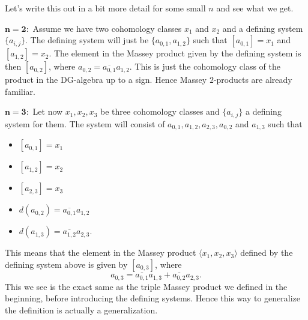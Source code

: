 Let's write this out in a bit more detail for some small $n$ and see what we get. 

$\mathbf{n=2}:$ Assume we have two cohomology classes $x_1$ and $x_2$ and a defining system $\{a_{i,j} \}$. The defining system will just be $\{ a_{0,1}, a_{1,2}\}$ such that $[a_{0,1}]=x_1$ and  $[a_{1,2}] = x_2$. The element in the Massey product given by the defining system is then $[a_{0,2}]$, where $a_{0, 2} = \overline{a_{0, 1}}a_{1, 2}$. This is just the cohomology class of the product in the DG-algebra up to a sign. Hence Massey $2$-products are already familiar. 


$\mathbf{n=3}:$ Let now $x_1, x_2, x_3$ be three cohomology classes and $\{a_{i,j}\}$ a defining system for them. The system will consist of $a_{0,1}, a_{1,2}, a_{2,3}, a_{0,2}$ and $a_{1,3}$ such that 
\begin{itemize}
    \item $[a_{0,1}] = x_1$
    \item $[a_{1,2}] = x_2$
    \item $[a_{2,3}] = x_3$
    \item $d(a_{0,2}) = \overline{a_{0,1}} a_{1,2}$
    \item $d(a_{1,3}) = \overline{a_{1,2}} a_{2,3}$.
\end{itemize}
This means that the element in the Massey product $\langle x_1, x_2, x_3 \rangle$ defined by the defining system above is given by $[a_{0,3}]$, where
\begin{equation*}
    a_{0,3} = \overline{a_{0, 1}}a_{1, 3} + \overline{a_{0, 2}}a_{2, 3}.
\end{equation*}
This we see is the exact same as the triple Massey product we defined in the beginning, before introducing the defining systems. Hence this way to generalize the definition is actually a generalization. 

